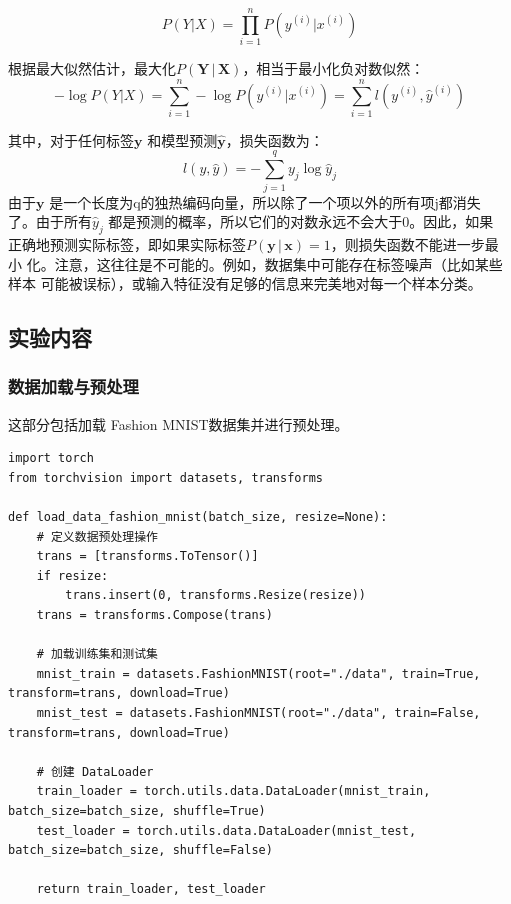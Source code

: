 \documentclass[a4paper,12pt]{article}
\begin{document}
\begin{equation}
P(Y | X) = \prod_{i=1}^{n} P(y^{(i)} | x^{(i)})
\end{equation}

根据最大似然估计，最大化$P(\mathbf{Y} \,| \, \mathbf{X})$，相当于最小化负对数似然：
\begin{equation}
-\log P(Y | X) = \sum_{i=1}^{n} -\log P(y^{(i)} | x^{(i)}) = \sum_{i=1}^{n} l(y^{(i)}, \hat{y}^{(i)})
\end{equation}

其中，对于任何标签$\mathbf{y}$ 和模型预测$\hat{\mathbf{y}}$，损失函数为：
\begin{equation}
l(y, \hat{y}) = - \sum_{j=1}^{q} y_j \log \hat{y}_j
\end{equation}
由于$\mathbf{y}$ 是一个长度为q的独热编码向量，所以除了一个项以外的所有项j都消失
了。由于所有$\hat{y}_j$ 都是预测的概率，所以它们的对数永远不会大于0。因此，如果
正确地预测实际标签，即如果实际标签$P(\mathbf{y} \,| \, \mathbf{x}) = 1$，则损失函数不能进一步最小
化。注意，这往往是不可能的。例如，数据集中可能存在标签噪声（比如某些样本
可能被误标），或输入特征没有足够的信息来完美地对每一个样本分类。

\subsection{实验内容}
\subsubsection{数据加载与预处理}
这部分包括加载 Fashion MNIST数据集并进行预处理。
\begin{lstlisting}
import torch
from torchvision import datasets, transforms

def load_data_fashion_mnist(batch_size, resize=None):
    # 定义数据预处理操作
    trans = [transforms.ToTensor()]
    if resize:
        trans.insert(0, transforms.Resize(resize))
    trans = transforms.Compose(trans)

    # 加载训练集和测试集
    mnist_train = datasets.FashionMNIST(root="./data", train=True, transform=trans, download=True)
    mnist_test = datasets.FashionMNIST(root="./data", train=False, transform=trans, download=True)

    # 创建 DataLoader
    train_loader = torch.utils.data.DataLoader(mnist_train, batch_size=batch_size, shuffle=True)
    test_loader = torch.utils.data.DataLoader(mnist_test, batch_size=batch_size, shuffle=False)

    return train_loader, test_loader
\end{lstlisting}
\end{document}
